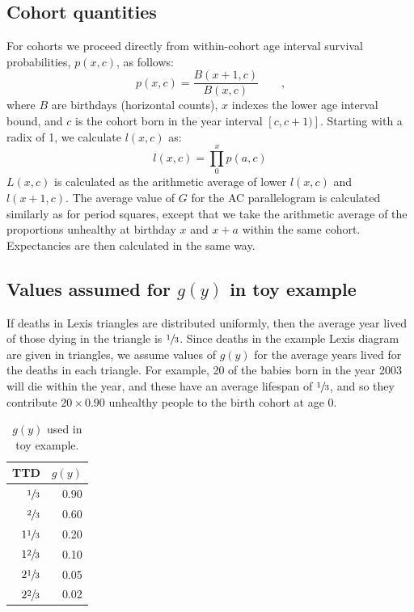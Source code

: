\documentclass[11pt,oneside,a4paper]{article} %
\newcommand{\tc}{\quad\quad\text{,}}
\begin{document}
\subsection{Cohort quantities}
For cohorts we proceed directly from within-cohort age interval survival
probabilities, $p(x,c)$, as follows:
\begin{equation}
p(x,c) = \frac{B(x+1,c)}{B(x,c)} \tc
\end{equation}
where $B$ are birthdays (horizontal counts), $x$ indexes the lower age interval
bound, and $c$ is the cohort born in the year interval $[c,c+1)]$. Starting with
a radix of 1, we calculate $l(x,c)$ as:
\begin{equation}
l(x,c) = \prod_0^x p(a,c)
\end{equation}
$L(x,c)$ is calculated as the arithmetic average of lower $l(x,c)$ and
$l(x+1,c)$. The average value of $G$ for the AC parallelogram is calculated
similarly as for period squares, except that we take the arithmetic average of
the proportions unhealthy at birthday $x$ and $x+a$ within the same cohort.
Expectancies are then calculated in the same way.

\subsection{Values assumed for $g(y)$ in toy example}
If deaths in Lexis triangles are distributed uniformly, then the average year
lived of those dying in the triangle is $\sfrac{1}{3}$. Since deaths in the
example Lexis diagram are given in triangles, we assume values of $g(y)$ for the
average years lived for the deaths in each triangle. For example, 20 of the
babies born in the year 2003 will die within the year, and these have an average
lifespan of $\sfrac{1}{3}$, and so they contribute $20\times0.90$ unhealthy
people to the birth cohort at age 0. 

 \begin{table}[ht]
\centering
\begin{tabular}{rr}
\hline
TTD & $g(y)$ \\
\hline
$\sfrac{1}{3}$ & 0.90 \\
$\sfrac{2}{3}$ & 0.60 \\
$1\sfrac{1}{3}$ & 0.20 \\
$1\sfrac{2}{3}$ & 0.10 \\
$2\sfrac{1}{3}$ & 0.05 \\
$2\sfrac{2}{3}$ & 0.02 \\
\hline
\end{tabular}
\caption{$g(y)$ used in toy example.}
\label{tab:gy}
\end{table}
\end{document}
